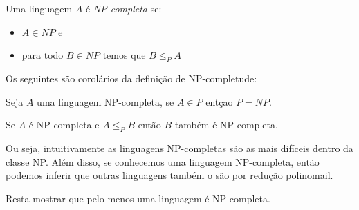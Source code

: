 Uma linguagem $A$ é {\em NP-completa} se:
\begin{itemize}
\item $A \in NP$ e
\item para todo $B \in NP$ temos que $B \leq_P A$
\end{itemize}

Os seguintes são corolários da definição de NP-completude:

\begin{corollary}
  Seja $A$ uma linguagem NP-completa, se $A \in P$ entçao $P = NP$.
\end{corollary}

\begin{corollary}
  Se $A$ é NP-completa e $A \leq_P B$ então $B$ também é NP-completa.
\end{corollary}

Ou seja, intuitivamente as linguagens NP-completas são as mais difíceis dentro da classe NP.
Além disso, se conhecemos uma linguagem NP-completa, então podemos inferir que outras linguagens também o são por redução polinomail.

Resta mostrar que pelo menos uma linguagem é NP-completa.

